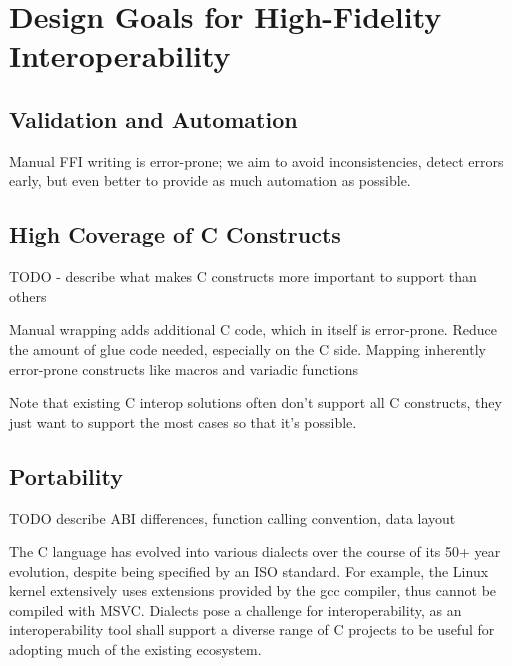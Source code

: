 \section{Design Goals for High-Fidelity Interoperability}
\label{sec:desirable_properties}

\subsection{Validation and Automation}
Manual FFI writing is error-prone; we aim to avoid inconsistencies, detect errors early, but even better to provide as much automation as possible.

\subsection{High Coverage of C Constructs}
TODO - describe what makes C constructs more important to support than others

Manual wrapping adds additional C code, which in itself is error-prone. Reduce the amount of glue code needed, especially on the C side.
Mapping inherently error-prone constructs like macros and variadic functions 

Note that existing C interop solutions often don't support all C constructs, they just want to support the most cases so that it's possible. 

\subsection{Portability}
TODO describe ABI differences, function calling convention, data layout

The C language has evolved into various dialects over the course of its 50+ year evolution, despite being specified by an ISO standard. For example, the Linux kernel extensively uses extensions provided by the gcc compiler, thus cannot be compiled with MSVC. Dialects pose a challenge for interoperability, as an interoperability tool shall support a diverse range of C projects to be useful for adopting much of the existing ecosystem.

